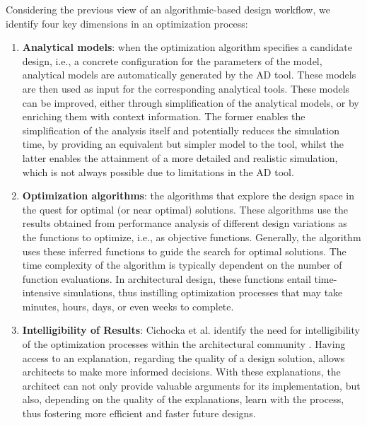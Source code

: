 	Considering the previous view of an algorithmic-based design workflow, we identify four key dimensions in an optimization process:
	
\begin{enumerate}
\item \textbf{Analytical models}: when the optimization algorithm specifies a candidate design, i.e., a concrete configuration for the parameters of the model, analytical models are automatically generated by the \ac{AD} tool. These models are then used as input for the corresponding analytical tools. These models can be improved, either through simplification of the analytical models, or by enriching them with context information. The former enables the simplification of the analysis itself and potentially reduces the simulation time, by providing an equivalent but simpler model to the tool, whilst the latter enables the attainment of a more detailed and realistic simulation, which is not always possible due to limitations in the \ac{AD} tool. 

\item \textbf{Optimization algorithms}: the algorithms that explore the design space in the quest for optimal (or near optimal) solutions. These algorithms use the results obtained from performance analysis of different design variations as the functions to optimize, i.e., as objective functions. Generally, the algorithm uses these inferred functions to guide the search for optimal solutions. The time complexity of the algorithm is typically dependent on the number of function evaluations. In architectural design, these functions entail time-intensive simulations, thus instilling optimization processes that may take minutes, hours, days, or even weeks to complete.

\item \textbf{Intelligibility of Results}: Cichocka et al. identify the need for intelligibility of the optimization processes within the architectural community \cite{Cichocka2017SURVEY}. Having access to an explanation, regarding the quality of a design solution, allows architects to make more informed decisions. With these explanations, the architect can not only provide valuable arguments for its implementation, but also, depending on the quality of the explanations, learn with the process, thus fostering more efficient and faster future designs. 


\end{enumerate}
